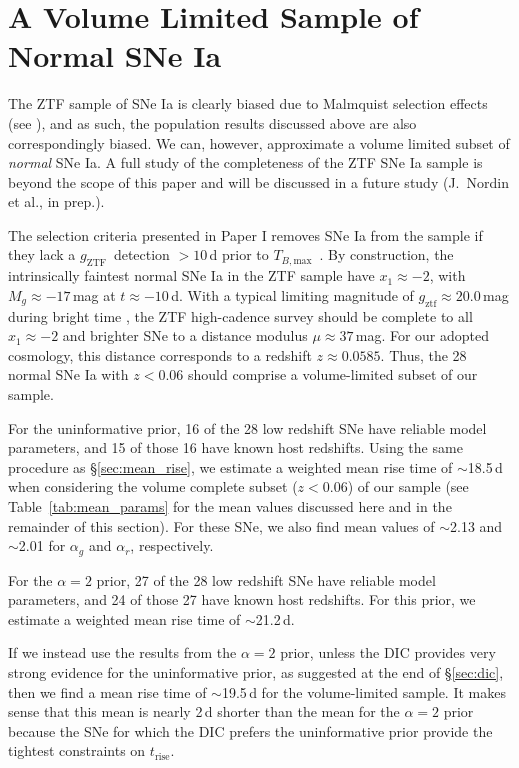 \documentclass[twocolumn]{aastex63}
\newcommand{\gztf}{$g_\mathrm{ZTF}$}
\newcommand{\trise}{$t_\mathrm{rise}$}
\newcommand{\tbmax}{$T_{B,\mathrm{max}}$}
\begin{document}
\section{A Volume Limited Sample of Normal SNe Ia}\label{sec:volume_limited}

The ZTF sample of SNe Ia is clearly biased due to Malmquist selection effects
(see \citealt{Yao19}), and as such, the population results discussed above are
also correspondingly biased. We can, however, approximate a volume limited
subset of \textit{normal} SNe Ia. A full study of the completeness of the ZTF
SNe Ia sample is beyond the scope of this paper and will be discussed in a
future study (J.~Nordin et al., in prep.).

The selection criteria presented in Paper I removes SNe Ia from the sample if
they lack a \gztf\ detection $> 10$\,d prior to \tbmax\ \citep{Yao19}. By
construction, the intrinsically faintest normal SNe Ia in the ZTF sample have
$x_1 \approx -2$, with $M_g \approx -17$\,mag at $t \approx -10$\,d. With a
typical limiting magnitude of $g_\mathrm{ztf} \approx 20.0$\,mag during bright
time \citep{Bellm19}, the ZTF high-cadence survey should be complete to all
$x_1 \approx -2$ and brighter SNe to a distance modulus $\mu \approx 37$\,mag.
For our adopted cosmology, this distance corresponds to a redshift $z \approx
0.0585$. Thus, the 28 normal SNe Ia with $z < 0.06$ should comprise a
volume-limited subset of our sample.

For the uninformative prior, 16 of the 28 low redshift SNe have reliable model
parameters, and 15 of those 16 have known host redshifts. Using the same
procedure as \S\ref{sec:mean_rise}, we estimate a weighted mean rise time of
$\sim$18.5\,d when considering the volume complete subset ($z < 0.06$) of our
sample (see Table~\ref{tab:mean_params} for the mean values discussed here and
in the remainder of this section). For these SNe, we also find mean values of
$\sim$2.13 and $\sim$2.01 for $\alpha_g$ and $\alpha_r$, respectively.

For the $\alpha = 2$ prior, 27 of the 28 low redshift SNe have reliable model
parameters, and 24 of those 27 have known host redshifts. For this prior, we
estimate a weighted mean rise time of $\sim$21.2\,d.

If we instead use the results from the $\alpha = 2$ prior, unless the DIC
provides very strong evidence for the uninformative prior, as suggested at the
end of \S\ref{sec:dic}, then we find a mean rise time of $\sim$19.5\,d for the
volume-limited sample. It makes sense that this mean is nearly 2\,d shorter
than the mean for the $\alpha=2$ prior because the SNe for which the DIC
prefers the uninformative prior provide the tightest constraints on \trise.
\end{document}
